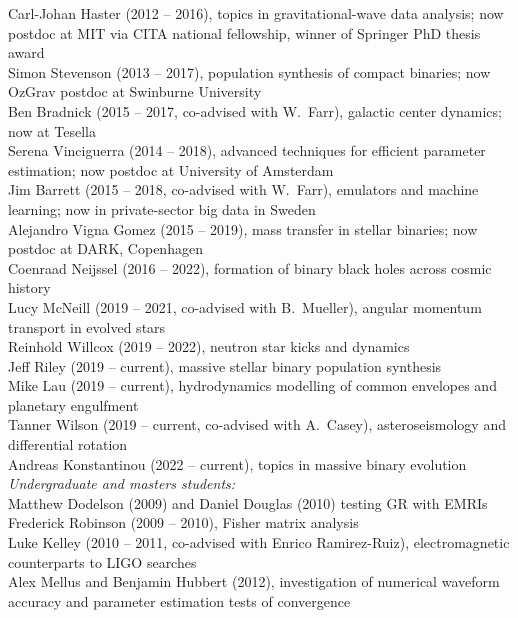 \documentclass[margin,line]{res}
\begin{document}
\begin{resume}
Carl-Johan Haster (2012 -- 2016), topics in gravitational-wave data analysis; now postdoc at MIT via CITA national fellowship, winner of Springer PhD thesis award\\
Simon Stevenson (2013 -- 2017), population synthesis of compact binaries; now OzGrav postdoc at Swinburne University\\
Ben Bradnick (2015 -- 2017, co-advised with W.~Farr), galactic center dynamics; now at Tesella\\
Serena Vinciguerra (2014 -- 2018), advanced techniques for efficient parameter estimation; now postdoc at University of Amsterdam\\
Jim Barrett (2015 -- 2018, co-advised with W.~Farr), emulators and machine learning; now in private-sector big data in Sweden \\
Alejandro Vigna Gomez (2015 -- 2019), mass transfer in stellar binaries; now postdoc at DARK, Copenhagen\\
Coenraad Neijssel (2016 -- 2022), formation of binary black holes across cosmic history\\
Lucy McNeill (2019 -- 2021, co-advised with B.~Mueller), angular momentum transport in evolved stars\\
Reinhold Willcox (2019 -- 2022), neutron star kicks and dynamics\\
Jeff Riley (2019 -- current), massive stellar binary population synthesis\\
Mike Lau (2019 -- current), hydrodynamics modelling of common envelopes and planetary engulfment\\
Tanner Wilson (2019 -- current, co-advised with A.~Casey), asteroseismology and differential rotation\\
Andreas Konstantinou (2022 -- current), topics in massive binary evolution
\\
{\it Undergraduate and masters students:}\\
Matthew Dodelson (2009) and Daniel Douglas (2010) testing GR with EMRIs\\ 
Frederick Robinson (2009 -- 2010), Fisher matrix analysis\\
Luke Kelley (2010 -- 2011, co-advised with Enrico Ramirez-Ruiz), electromagnetic counterparts to LIGO searches\\
Alex Mellus and Benjamin Hubbert (2012), investigation of numerical waveform accuracy and parameter estimation tests of convergence\\

\end{resume}
\end{document}
